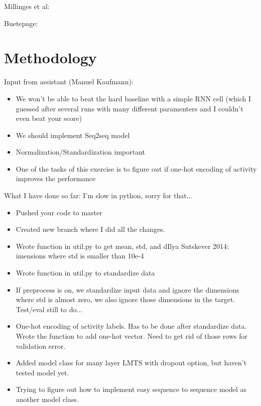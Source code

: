 Millinges et al:




Buetepage: \cite{Buetepage2017}



\section{Methodology}

Input from assistant (Manuel Kaufmann): 
\begin{itemize}
	\item We won't be able to beat the hard baseline with a simple RNN cell (which I guessed after several runs with many different paramenters and I couldn't even beat your score)
	\item We should implement Seq2seq model
	\item Normalization/Standardization important
	\item One of the tasks of this exercise is to figure out if one-hot encoding of activity improves the performance	
\end{itemize}



What I have done so far: I'm slow in python, sorry for that...
\begin{itemize}
	\item Pushed your code to master
	\item Created new branch where I did all the changes.
	\item Wrote function in util.py to get mean, std, and dIlya Sutskever 2014: \\imensions where std is smaller than 10e-4
	\item Wrote function in util.py to standardize data
	\item If preprocess is on, we standardize input data and ignore the dimensions where std is almost zero, we also ignore those dimensions in the target. Test/eval still to do...
	\item One-hot encoding of activity labels. Has to be done after standardize data. Wrote the function to add one-hot vector. Need to get rid of those rows for validation error.
	\item Added model class for many layer LMTS with dropout option, but haven't tested model yet.
	\item Trying to figure out how to implement easy sequence to sequence model as another model class.
\end{itemize}

